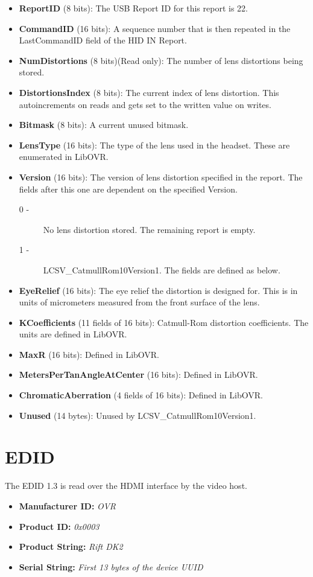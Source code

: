 \documentclass[letterpaper]{article}
\begin{document}
\begin{itemize}
  \item {\bfseries ReportID} (8 bits): The USB Report ID for this report is 22.
  \item {\bfseries CommandID} (16 bits): A sequence number that is then repeated in the LastCommandID field of the HID IN Report.
  \item {\bfseries NumDistortions} (8 bits)(Read only):  The number of lens distortions being stored.
  \item {\bfseries DistortionsIndex} (8 bits):  The current index of lens distortion.  This autoincrements on reads and gets set to the written value on writes.
  \item {\bfseries Bitmask} (8 bits):  A current unused bitmask.
  \item {\bfseries LensType} (16 bits):  The type of the lens used in the headset.  These are enumerated in LibOVR.
  \item {\bfseries Version} (16 bits):  The version of lens distortion specified in the report.  The fields after this one are dependent on the specified Version.
    \begin{description}
      \item[0 -] No lens distortion stored. The remaining report is empty.
      \item[1 -] LCSV\_CatmullRom10Version1. The fields are defined as below.
    \end{description}
  \item {\bfseries EyeRelief} (16 bits):  The eye relief the distortion is designed for.  This is in units of micrometers measured from the front surface of the lens.
  \item {\bfseries KCoefficients} (11 fields of 16 bits): Catmull-Rom distortion coefficients.  The units are defined in LibOVR.
  \item {\bfseries MaxR} (16 bits): Defined in LibOVR.
  \item {\bfseries MetersPerTanAngleAtCenter} (16 bits): Defined in LibOVR.
  \item {\bfseries ChromaticAberration} (4 fields of 16 bits): Defined in LibOVR.
  \item {\bfseries Unused} (14 bytes): Unused by LCSV\_CatmullRom10Version1.
\end{itemize}

\newpage

\section{EDID}

The EDID 1.3 is read over the HDMI interface by the video host.

\begin{itemize}
  \item {\bfseries Manufacturer ID:} {\em OVR}
  \item {\bfseries Product ID:} {\em 0x0003}
  \item {\bfseries Product String:} {\em Rift DK2}
  \item {\bfseries Serial String:} {\em First 13 bytes of the device UUID}
\end{itemize}
\end{document}
